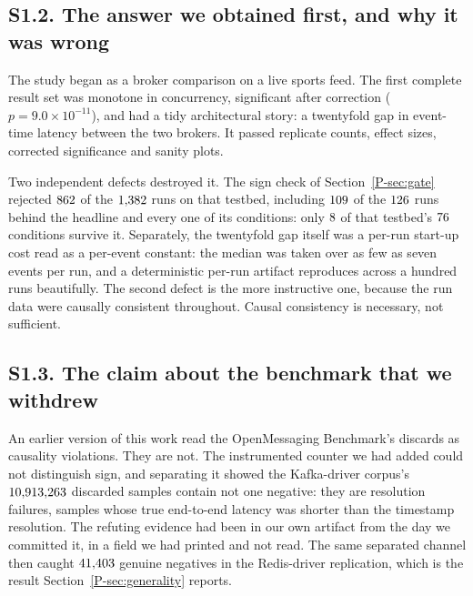 \documentclass[10pt,journal,onecolumn]{IEEEtran}
\newcommand{\mainGate}{\ref{P-sec:gate}}            %
\newcommand{\mainGenerality}{\ref{P-sec:generality}}       %
\begin{document}
\subsection{S1.2. The answer we obtained first, and why it was wrong}
\label{sec:attribution}

The study began as a broker comparison on a live sports feed. The first complete result set
was monotone in concurrency, significant after correction ($p = 9.0\times10^{-11}$), and had
a tidy architectural story: a twentyfold gap in event-time latency between the two brokers. It passed
replicate counts, effect sizes, corrected significance and sanity plots.

Two independent defects destroyed it. The sign check of Section~\mainGate{} rejected $862$ of the $1{,}382$ runs on that
testbed, including $109$ of the $126$ runs behind the headline
and every one of its \firstResultCellsWord{} conditions: only
$8$ of that testbed's $76$
conditions survive it. Separately, the twentyfold gap itself was a per-run start-up cost
read as a per-event constant: the median was taken over as few as seven events per run, and a
deterministic per-run artifact reproduces across a hundred runs beautifully. The second
defect is the more instructive one, because the run data were causally consistent throughout.
Causal consistency is necessary, not sufficient.

\subsection{S1.3. The claim about the benchmark that we withdrew}
\label{sec:firstanswer}

An earlier version of this work read the OpenMessaging Benchmark's discards as causality
violations. They are not. The instrumented counter we had added could not distinguish sign,
and separating it showed the Kafka-driver corpus's $10{,}913{,}263$ discarded samples
contain not one negative: they are resolution failures, samples whose true end-to-end latency
was shorter than the timestamp resolution. The refuting evidence had been in our own artifact from
the day we committed it, in a field we had printed and not read. The same separated channel
then caught $41{,}403$ genuine negatives in the Redis-driver replication, which is the result Section~\mainGenerality{} reports.
\end{document}
